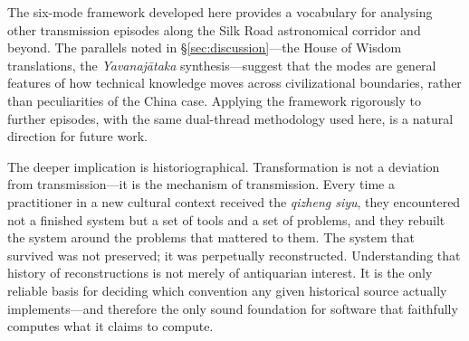 \documentclass[10pt,a4paper]{article}
\begin{document}
The six-mode framework developed here provides a vocabulary for analysing other
transmission episodes along the Silk Road astronomical corridor and beyond.  The
parallels noted in \S\ref{sec:discussion}---the House of Wisdom translations,
the \textit{Yavanaj\={a}taka} synthesis---suggest that the modes are general
features of how technical knowledge moves across civilizational boundaries,
rather than peculiarities of the China case.  Applying the framework rigorously
to further episodes, with the same dual-thread methodology used here, is a
natural direction for future work.

The deeper implication is historiographical.  Transformation is not a deviation
from transmission---it is the mechanism of transmission.  Every time a
practitioner in a new cultural context received the \textit{qizheng siyu}, they
encountered not a finished system but a set of tools and a set of problems, and
they rebuilt the system around the problems that mattered to them.  The system
that survived was not preserved; it was perpetually reconstructed.  Understanding
that history of reconstructions is not merely of antiquarian interest.  It is
the only reliable basis for deciding which convention any given historical source
actually implements---and therefore the only sound foundation for software that
faithfully computes what it claims to compute.



\end{document}
